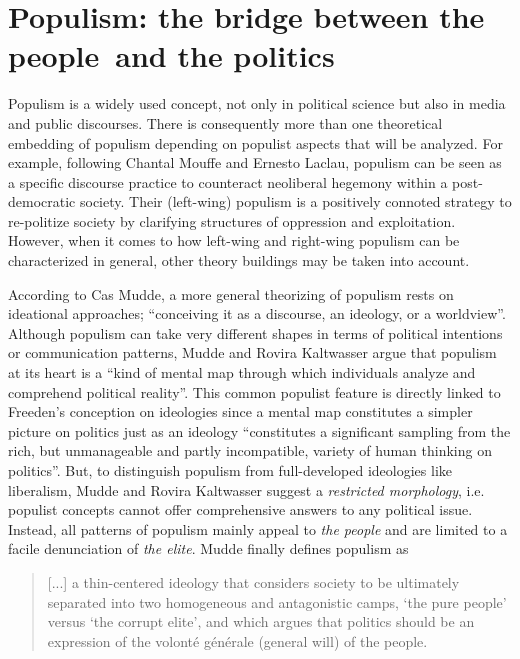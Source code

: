 \documentclass[a4paper]{scrreprt}
\begin{document}
\section{Populism: the bridge between \guilsinglright the people\guilsinglleft\ and \guilsinglright the politics\guilsinglleft}
Populism is a widely used concept, not only in political science but also in media and public discourses. There is consequently more than one theoretical embedding of populism depending on populist aspects that will be analyzed. For example, following Chantal Mouffe and Ernesto Laclau, populism can be seen as a specific discourse practice to counteract neoliberal hegemony within a post-democratic society. Their (left-wing) populism is a positively connoted strategy to re-politize society by clarifying structures of oppression and exploitation. \citep{laclaumouffe:2001} However, when it comes to how left-wing and right-wing populism can be characterized in general, other theory buildings may be taken into account.\par
According to Cas Mudde, a more general theorizing of populism rests on ideational approaches; ``conceiving it as a discourse, an ideology, or a worldview''. \cite[p.~5]{mudde:2017} Although populism can take very different shapes in terms of political intentions or communication patterns, Mudde and Rovira Kaltwasser argue that populism at its heart is a ``kind of mental map through which individuals analyze and comprehend political reality''. \cite[p.~6]{mudde:2017} This common populist feature is directly linked to Freeden's conception on ideologies since a mental map constitutes a simpler picture on politics just as an ideology ``constitutes a significant sampling from the rich, but unmanageable and partly incompatible, variety of human thinking on politics''. \cite[p.~54]{freeden:1998} But, to distinguish populism from full-developed ideologies like liberalism, Mudde and Rovira Kaltwasser suggest a {\em restricted morphology}, i.e. populist concepts cannot offer comprehensive answers to any political issue. Instead, all patterns of populism mainly appeal to {\em the people} and are limited to a facile denunciation of {\em the elite}. Mudde finally defines populism as\par
\begin{quote}
    [...] a thin-centered ideology that considers society to be ultimately separated into two homogeneous and antagonistic camps, `the pure people' versus `the corrupt elite', and which argues that politics should be an expression of the volonté générale (general will) of the people. \cite[p.~6]{mudde:2017}
\end{quote}
\end{document}
